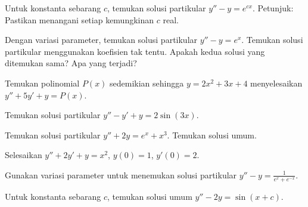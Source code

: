 \begin{exercise}
Untuk konstanta sebarang $c$, temukan solusi partikular $y''-y=e^{cx}$. Petunjuk: Pastikan menangani setiap kemungkinan $c$ real.
\end{exercise}

\begin{exercise} \label{exercise:diffvarparunder}
\pagebreak[2]
\leavevmode
\begin{tasks}
\task Dengan variasi parameter, temukan solusi partikular $y''-y = e^x$.
\task Temukan solusi partikular menggunakan koefisien tak tentu.
\task Apakah kedua solusi yang ditemukan sama? Apa yang terjadi?
\end{tasks}
\end{exercise}

\begin{exercise}
Temukan polinomial $P(x)$ sedemikian sehingga $y = 2 x^2 + 3 x + 4$ menyelesaikan $y''+5 y'+ y = P(x)$.
\end{exercise}

\setcounter{exercise}{100}

\begin{exercise}
Temukan solusi partikular $y''-y'+y=2\sin(3x)$.
\end{exercise}

\begin{samepage}
\begin{exercise}
\leavevmode
\begin{tasks}
\task Temukan solusi partikular $y''+2y=e^x + x^3$.
\task Temukan solusi umum.
\end{tasks}
\end{exercise}
\end{samepage}

\begin{exercise}
Selesaikan $y''+2y'+y = x^2$, $y(0)=1$, $y'(0)=2$.
\end{exercise}

\begin{exercise}
Gunakan variasi parameter untuk menemukan solusi partikular $y''-y = \frac{1}{e^x+e^{-x}}$.
\end{exercise}

\begin{exercise}
Untuk konstanta sebarang $c$, temukan solusi umum $y''-2y=\sin(x+c)$.
\end{exercise}

